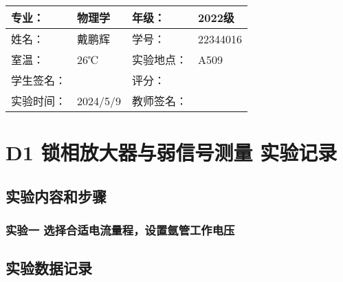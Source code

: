 \documentclass[dvipsnames, svgnames,a4paper,11pt]{article}
\begin{document}
\clearpage
\begin{table}
	\renewcommand\arraystretch{1.7}
	\centering
	\begin{tabularx}{\textwidth}{|X|X|X|X|}
	\hline
	专业：& 物理学 &年级：& 2022级 \\
	\hline
	姓名：& 戴鹏辉 & 学号：& 22344016 \\
	\hline
	室温：& 26℃ & 实验地点： & A509 \\
	\hline
	学生签名：& & 评分： &\\
	\hline
	实验时间：& 2024/5/9 & 教师签名：&\\
	\hline
	\end{tabularx}
\end{table}

\section{D1 \quad 锁相放大器与弱信号测量 \quad\heiti 实验记录}
\subsection{实验内容和步骤}

	\subsubsection{实验一 \quad 选择合适电流量程，设置氩管工作电压}
	
		



\subsection{实验数据记录}







\end{document}
